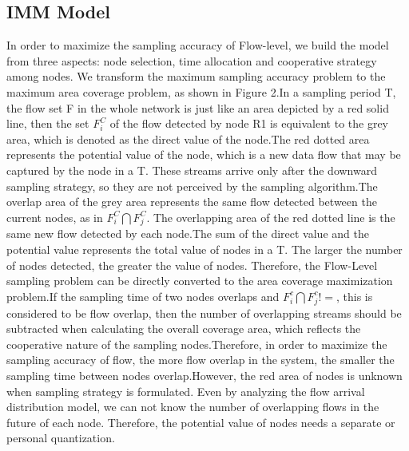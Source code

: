 \documentclass[conference,compsoc]{IEEEtran}
\begin{document}
\subsection{IMM  Model}
In order to maximize the sampling accuracy of Flow-level, we build the model from three aspects: node selection, time allocation and cooperative strategy among nodes. We transform the maximum sampling accuracy problem to the maximum area coverage problem, as shown in Figure 2.In a sampling period T, the flow set F in the whole network is just like an area depicted by a red solid line, then the set $F_i^ C$ of the flow detected by node R1 is equivalent to the grey area, which is denoted as the direct value of the node.The red dotted area represents the potential value of the node, which is a new data flow that may be captured by the node in a T. These streams arrive only after the downward sampling strategy, so they are not perceived by the sampling algorithm.The overlap area of the grey area represents the same flow detected between the current nodes, as in $F_i ^ C \bigcap F_j ^ C$. The overlapping area of the red dotted line is the same new flow detected by each node.The sum of the direct value and the potential value represents the total value of nodes in a T. The larger the number of nodes detected, the greater the value of nodes. Therefore, the Flow-Level sampling problem can be directly converted to the area coverage maximization problem.If the sampling time of two nodes overlaps and $F^c_i \bigcap F^c_j!={}$, this is considered to be flow overlap, then the number of overlapping streams should be subtracted when calculating the overall coverage area, which reflects the cooperative nature of the sampling nodes.Therefore, in order to maximize the sampling accuracy of flow, the more flow overlap in the system, the smaller the sampling time between nodes overlap.However, the red area of nodes is unknown when sampling strategy is formulated. Even by analyzing the flow arrival distribution model, we can not know the number of overlapping flows in the future of each node. Therefore, the potential value of nodes needs a separate or personal quantization.
\end{document}
